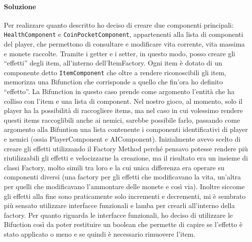 \documentclass[a4paper,12pt]{report}
\begin{document}
\paragraph*{Soluzione}
	Per realizzare quanto descritto ho deciso di creare due componenti principali: \texttt{HealthComponent} e \texttt{CoinPocketComponent}, appartenenti alla lista di componenti del player, che permettono di consultare e modificare vita corrente, vita massima e monete raccolte. Tramite i getter e i setter, in questo modo, posso creare gli “effetti” degli item, all'interno dell'ItemFactory.  Ogni item è dotato di un componente detto \texttt{ItemComponent} che oltre a rendere riconoscibili gli item, memorizza una Bifunction che corrisponde a quello che fin'ora ho definito “effetto”. La Bifunction in questo caso prende come argomento l'entità che ha colliso con l'item e una lista di component. Nel nostro gioco, al momento, solo il player ha la possibilità di raccogliere items, ma nel caso in cui volessimo rendere questi items raccoglibili anche ai nemici, sarebbe possibile farlo, passando come argomento alla Bifuntion una lista contenente i componenti identificativi di player e nemici (ossia PlayerComponent e AIComponent).
	Inizialmente avevo scelto di creare gli effetti utilizzando il Factory Method perché pensavo potesse rendere più riutilizzabili gli effetti e velocizzarne la creazione, ma il risultato era un insieme di classi Factory, molto simili tra loro e la cui unica differenza era operare su componenti diversi (una factory per gli effetti che modificavano la vita, un'altra per quelli che modificavano l'ammontare delle monete e così via).
	Inoltre siccome gli effetti alla fine sono praticamente solo incrementi e decrementi, mi è sembrato più sensato utilizzare interfacce funzionali e lamba per crearli all'interno della factory. 
	Per quanto riguarda le interfacce funzionali, ho deciso di utilizzare le Bifuction così da poter restituire un boolean che permette di capire se l'effetto è stato applicato o meno e se quindi è necessario rimuovere l'item.
\end{document}
